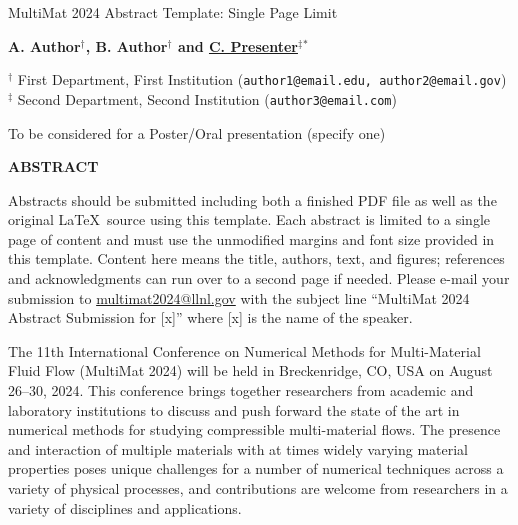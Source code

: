 \documentclass[11pt]{article}
\newenvironment{AbstractTitle}{\begin{center} \bf \par\Large}{\par\addvspace{\bigskipamount} \end{center}}
\newcommand\email[1]{\href{mailto:{#1}}{#1}}
\begin{document}
\pagestyle{empty}

%
%
\begin{AbstractTitle}
        MultiMat 2024 Abstract Template: Single Page Limit
\end{AbstractTitle}

%
%
\begin{center}
\textbf{A. Author$^\dagger$, B. Author$^\dagger$ and \underline{C. Presenter}$^\ddagger$$^\ast$}

%
%
$^\dagger${
             First Department, First Institution 
             ({\tt author1@email.edu, author2@email.gov}) 
          } \\

$^\ddagger${
             Second Department, Second Institution 
             ({\tt author3@email.com})
           }                   
\end{center}

%
%
To be considered for a Poster/Oral presentation (specify one)

\begin{center}
\textbf{ABSTRACT}\\[1mm]
\end{center}

%
%
Abstracts should be submitted including both a finished PDF file as well as the original \LaTeX\ source using this template.  Each abstract is limited to a single page of content and must use the unmodified margins and font size provided in this template.  Content here means the title, authors, text, and figures; references and acknowledgments can run over to a second page if needed.  Please e-mail your submission to \email{multimat2024@llnl.gov} with the subject line ``MultiMat 2024 Abstract Submission for [x]'' where [x] is the name of the speaker.

The 11th International Conference on Numerical Methods for Multi-Material Fluid Flow (MultiMat 2024) will be held in Breckenridge, CO, USA on August 26--30, 2024. This conference brings together researchers from academic and laboratory institutions to discuss and push forward the state of the art in numerical methods for studying compressible multi-material flows. The presence and interaction of multiple materials with at times widely varying material properties poses unique challenges for a number of numerical techniques across a variety of physical processes, and contributions are welcome from researchers in a variety of disciplines and applications.  
\end{document}
